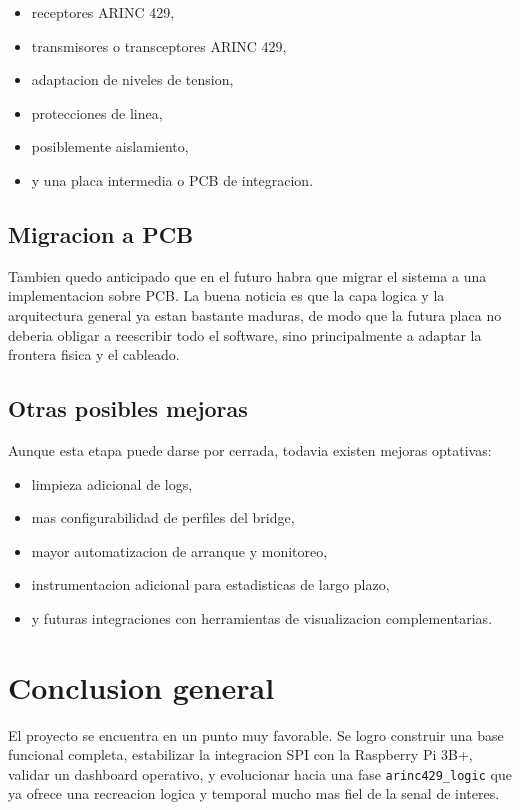 \documentclass[12pt,a4paper,oneside]{report}
\begin{document}
\begin{itemize}[leftmargin=1.2cm]
    \item receptores ARINC 429,
    \item transmisores o transceptores ARINC 429,
    \item adaptacion de niveles de tension,
    \item protecciones de linea,
    \item posiblemente aislamiento,
    \item y una placa intermedia o PCB de integracion.
\end{itemize}

\section{Migracion a PCB}

Tambien quedo anticipado que en el futuro habra que migrar el sistema a una implementacion sobre PCB. La buena noticia es que la capa logica y la arquitectura general ya estan bastante maduras, de modo que la futura placa no deberia obligar a reescribir todo el software, sino principalmente a adaptar la frontera fisica y el cableado.

\section{Otras posibles mejoras}

Aunque esta etapa puede darse por cerrada, todavia existen mejoras optativas:

\begin{itemize}[leftmargin=1.2cm]
    \item limpieza adicional de logs,
    \item mas configurabilidad de perfiles del bridge,
    \item mayor automatizacion de arranque y monitoreo,
    \item instrumentacion adicional para estadisticas de largo plazo,
    \item y futuras integraciones con herramientas de visualizacion complementarias.
\end{itemize}

\chapter{Conclusion general}

El proyecto se encuentra en un punto muy favorable. Se logro construir una base funcional completa, estabilizar la integracion SPI con la Raspberry Pi 3B+, validar un dashboard operativo, y evolucionar hacia una fase \texttt{arinc429\_logic} que ya ofrece una recreacion logica y temporal mucho mas fiel de la senal de interes.
\end{document}
